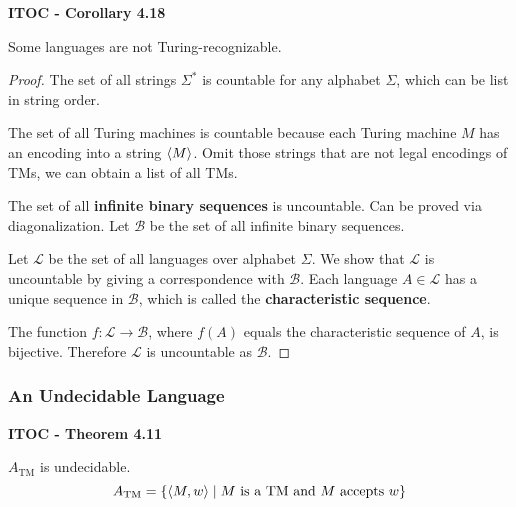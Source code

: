 \begin{shaded}
\textbf{ITOC - Corollary 4.18}

\medskip
Some languages are not Turing-recognizable.
\end{shaded}

\begin{mdframed}
\begin{proof}

The set of all strings $\Sigma^*$ is countable for any alphabet $\Sigma$, which can be list in string order.

The set of all Turing machines is countable because each Turing machine $M$ has an encoding into a string $\langle{M}\rangle$. Omit those strings that are not legal encodings of TMs, we can obtain a list of all TMs.

The set of all \textbf{infinite binary sequences} is uncountable. Can be proved via diagonalization. Let $\mathcal{B}$ be the set of all infinite binary sequences.

Let $\mathcal{L}$ be the set of all languages over alphabet $\Sigma$. We show that $\mathcal{L}$ is uncountable by giving a correspondence with $\mathcal{B}$. Each language $A \in \mathcal{L}$ has a unique sequence in $\mathcal{B}$, which is called the \textbf{characteristic sequence}. 

The function $f:\mathcal{L}\rightarrow \mathcal{B}$, where $f(A)$ equals the characteristic sequence of $A$, is bijective. Therefore $\mathcal{L}$ is uncountable as $\mathcal{B}$.
\end{proof}
\end{mdframed}

\subsubsection{An Undecidable Language}

\label{lang:ATM_UDCDB}
\begin{shaded}
\textbf{ITOC - Theorem 4.11}

\medskip
$A_\text{TM}$ is undecidable.
\[
A_\text{TM} = \{\langle{M, w}\rangle \mid M \text{ is a TM and $M$ accepts $w$} \}
\]
\end{shaded}

